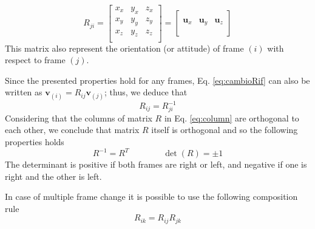 \documentclass[preprint, 12pt]{elsarticle}
\def\vect#1{{\boldsymbol{#1}}}
\begin{document}
\begin{equation}
    R_{ji} = \left[
    \begin{array}{c|c|c}
        x_{x} & y_{x} & z_{x} \\
        x_{y} & y_{y} & z_{y} \\
        x_{z} & y_{z} & z_{z} \\
    \end{array}
    \right]
     = \left[
    \begin{array}{c|c|c}
         &  &  \\
        \vect{u}_x & \vect{u}_y & \vect{u}_z \\
         &  & \\
    \end{array}
    \right]
    \label{eq:column}
\end{equation}
This matrix also represent the orientation (or attitude) of frame $(i)$ with respect to frame $(j)$.

Since the presented properties hold for any frames, Eq. \ref{eq:cambioRif} can also be written as $\vect{v}_{(i)} = R_{ij} \vect{v}_{(j)}$; thus, we deduce  that
\begin{equation}
    R_{ij}=R_{ji}^{-1}
    \label{eq:inverseR}
\end{equation}
Considering that the columns of matrix $R$ in Eq. \ref{eq:column} are orthogonal to each other, we conclude that matrix $R$ itself is orthogonal and so the following properties holds
\begin{equation}
    R^{-1}=R^T \qquad\qquad \det(R)=\pm 1
    \label{eq:RiRT}
\end{equation}
The determinant is positive if both frames are right or left, and negative if one is right and the other is left.

In case of multiple frame change it is possible to use the following composition rule
\begin{equation}
    R_{ik} = R_{ij} R_{jk}
    \label{eq:MultiR}
\end{equation}
\end{document}
